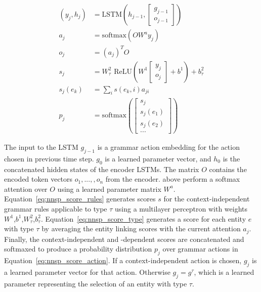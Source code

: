 \begin{align}
 (y_j, h_j) & = \text{LSTM}(h_{j-1}, \begin{bmatrix}g_{j-1} \\ 
o_{j-1}\end{bmatrix}) \label{eq:nnsp_decoder_lstm} \\
 a_j & = \text{softmax}(O W^a y_j) \label{eq:nnsp_decoder_lstm_output}\\
 o_j & = (a_j)^T O  \label{eq:nnsp_decoder_soft_att}\\
 s_j & = W^2_\tau \text{ ReLU}( W^1 \begin{bmatrix}y_j \\ o_j \end{bmatrix} + 
b^1) + b^2_\tau \label{eq:nnsp_score_rules}\\
 s_j(e_k) & = \sum_i s(e_k, i) a_{ji} \label{eq:nnsp_score_type}\\
 p_j & = \text{softmax}( \begin{bmatrix} s_j \\ s_j(e_1) \\ s_j(e_2) \\ ... 
\end{bmatrix} ) \label{eq:nnsp_score_action}
\end{align}

The input to the LSTM $g_{j-1}$ is a grammar action embedding for the action 
chosen in previous time step. $g_0$ is a learned parameter vector, and $h_0$ is 
the concatenated hidden states of the encoder LSTMs. The matrix $O$ contains 
the encoded token vectors $o_1, ..., ,o_n$ from the encoder. 
 above perform a 
softmax attention over $O$ using a learned parameter matrix $W^a$. 
Equation~\ref{eq:nnsp_score_rules} generates scores $s$ for the 
context-independent grammar rules applicable to type $\tau$ using a multilayer 
perceptron with weights $W^1$,$b^1$,$W^2_\tau$,$b^2_\tau$. 
Equation~\ref{eq:nnsp_score_type} generates a score for each entity $e$ with 
type $\tau$ by averaging the entity linking scores with the current attention 
$a_j$. Finally, the context-independent and -dependent scores are concatenated 
and softmaxed to produce a probability distribution $p_j$ over grammar actions 
in Equation~\ref{eq:nnsp_score_action}. If a context-independent action is 
chosen, $g_{j}$ is a learned parameter vector for that action. Otherwise $g_{j} 
= g^\tau$, which is a learned parameter representing the selection of an entity 
with type $\tau$.


